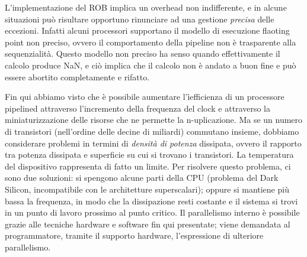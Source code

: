\begin{figure}[ht]
    \centering
    \setlength{\fboxrule}{0.5pt} %
    \setlength{\fboxsep}{0pt}    %
\end{figure}

\noindent L'implementazione del ROB implica un overhead non indifferente, e in alcune situazioni può risultare opportuno rinunciare ad una gestione \textit{precisa} delle eccezioni. Infatti alcuni processori supportano il modello di esecuzione flaoting point non preciso, ovvero il comportamento della pipeline non è trasparente alla sequenzialità. Questo modello non preciso ha senso quando effettivamente il calcolo produce NaN, e ciò implica che il calcolo non è andato a buon fine e può essere abortito completamente e rifatto. 

\noindent Fin qui abbiamo visto che è possibile aumentare l'ìefficienza di un processore pipelined attraverso l'incremento della frequenza del clock e attraverso la miniaturizzazione delle risorse che ne permette la n-uplicazione. Ma se un numero di transistori (nell'ordine delle decine di miliardi) commutano insieme, dobbiamo considerare problemi in termini di \textit{densità di potenza} dissipata, ovvero il rapporto tra potenza dissipata e superficie su cui si trovano i transistori. La temperatura del dispositivo rappresenta di fatto un limite. Per risolvere questo problema, ci sono due soluzioni: si spengono alcune parti della CPU (problema del Dark Silicon, incompatibile con le architetture superscalari); oppure si mantiene più bassa la frequenza, in modo che la dissipazione resti costante e il sistema si trovi in un punto di lavoro prossimo al punto critico.  
Il parallelismo interno è possibile grazie alle tecniche hardware e software fin qui presentate; viene demandata al programmatore, tramite il supporto hardware, l'espressione di ulteriore parallelismo.